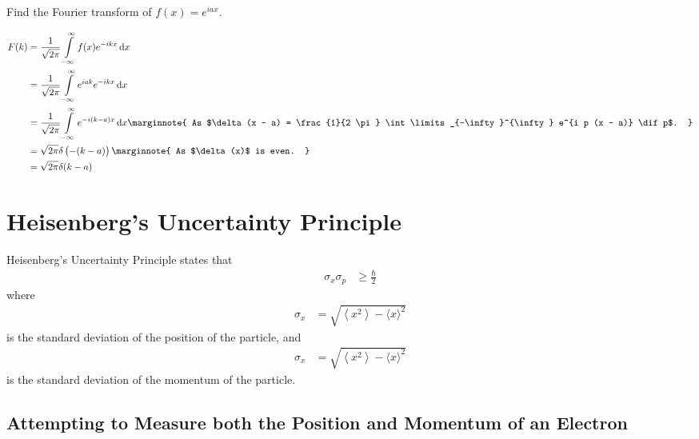 \documentclass[titlepage, fleqn, a4paper, 12pt, twoside]{article}
\theoremstyle{definition}
\theoremstyle{theorem}
\begin{document}
\begin{question}
	Find the Fourier transform of $f(x) = e^{i a x}$.
\end{question}

\begin{solution}
	\begin{align*}
		F(k) &= \frac{1}{\sqrt{2 \pi}} \int\limits_{-\infty}^{\infty} f(x) e^{-i k x} \dif x\\
		&= \frac{1}{\sqrt{2 \pi}} \int\limits_{-\infty}^{\infty} e^{i a k} e^{-i k x} \dif x\\
		&= \frac{1}{\sqrt{2 \pi}} \int\limits_{-\infty}^{\infty} e^{-i (k - a) x} \dif x
		\marginnote
		{
			As $\delta(x - a) = \frac{1}{2 \pi} \int\limits_{-\infty}^{\infty} e^{i p (x - a)} \dif p$.
		}\\
		&= \sqrt{2 \pi} \delta\left( -(k - a) \right)
		\marginnote
		{
			As $\delta(x)$ is even.
		}\\
		&= \sqrt{2 \pi} \delta(k - a)
	\end{align*}
\end{solution}

\section{Heisenberg's Uncertainty Principle}

Heisenberg's Uncertainty Principle states that
\begin{align*}
	\sigma_x \sigma_p &\ge \frac{\hbar}{2}
\end{align*}
where
\begin{align*}
	\sigma_x &= \sqrt{\left\langle x^2 \right\rangle - {\langle x \rangle}^2}
\end{align*}
is the standard deviation of the position of the particle, and
\begin{align*}
	\sigma_x &= \sqrt{\left\langle x^2 \right\rangle - {\langle x \rangle}^2}
\end{align*}
is the standard deviation of the momentum of the particle.

\subsection{Attempting to Measure both the Position and Momentum of an Electron}
\end{document}
